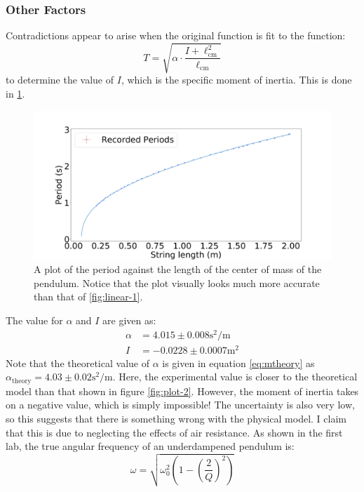 \documentclass[%
 reprint,
 amsmath,amssymb
 aps,
]{revtex4-2}
\begin{document}
\subsubsection{Other Factors}
Contradictions appear to arise when the original function is fit to the function:
\begin{equation}
    T = \sqrt{\alpha \cdot \frac{I+\ell_\text{cm}^2}{\ell_\text{cm}}}
    \label{eq:moment of inertia}
\end{equation}
to determine the value of $I$, which is the specific moment of inertia. This is done in \ref{fig:normal-complex}.
\begin{figure}[!h]
    \includegraphics[width=\linewidth]{Figures/normal_complex.png}

    \caption{A plot of the period against the length of the center of mass of the pendulum. Notice that the plot visually looks much more accurate than that of \ref{fig:linear-1}.}
    \label{fig:normal-complex}
\end{figure}
The value for $\alpha$ and $I$ are given as:
\begin{align}
    \alpha &= 4.015 \pm 0.008 \si{\second\squared\per\meter}\\ 
    I &= -0.0228 \pm 0.0007 \si{\meter\squared}
\end{align}
Note that the theoretical value of $\alpha$ is given in equation \ref{eq:mtheory} as $\alpha_\text{theory}=4.03 \pm 0.02 \si{\second\squared\per\meter}$. Here, the experimental value is closer to the theoretical model than that shown in figure \ref{fig:plot-2}. However, the moment of inertia takes on a negative value, which is simply impossible! The uncertainty is also very low, so this suggests that there is something wrong with the physical model. I claim that this is due to neglecting the effects of air resistance. As shown in the first lab, the true angular frequency of an underdampened pendulum is:
\begin{equation}
    \omega = \sqrt{\omega_0^2\left(1-\left(\frac{2}{Q}\right)^2\right)}
    \label{eq:omegalol}
\end{equation}
\end{document}

